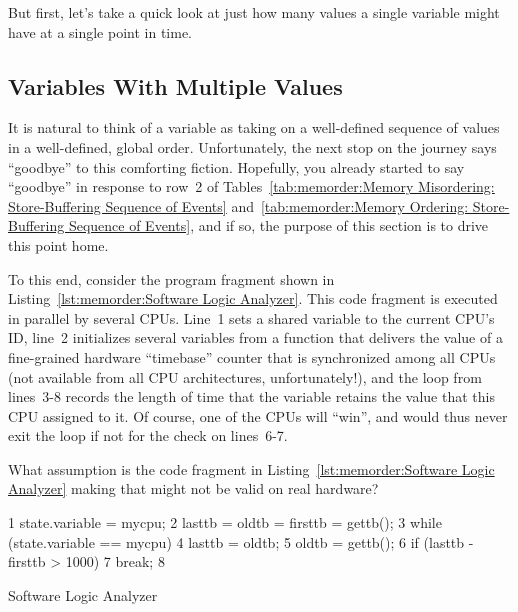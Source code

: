 But first, let's take a quick look at just how many values a single
variable might have at a single point in time.

\subsection{Variables With Multiple Values}
\label{sec:memorder:Variables With Multiple Values}

It is natural to think of a variable as taking on a well-defined
sequence of values in a well-defined, global order.
Unfortunately, the next stop on the journey says ``goodbye'' to this comforting fiction.
Hopefully, you already started to say ``goodbye'' in response to row~2 of
Tables~\ref{tab:memorder:Memory Misordering: Store-Buffering Sequence of Events}
and~\ref{tab:memorder:Memory Ordering: Store-Buffering Sequence of Events},
and if so, the purpose of this section is to drive this point home.

To this end, consider the program fragment shown in
Listing~\ref{lst:memorder:Software Logic Analyzer}.
This code fragment is executed in parallel by several CPUs.
Line~1 sets a shared variable to the current CPU's ID, line~2
initializes several variables from a  function that
delivers the value of a fine-grained hardware ``timebase'' counter that is
synchronized among all CPUs (not available from all CPU architectures,
unfortunately!), and the loop from lines~3-8 records the length of
time that the variable retains the value that this CPU assigned to it.
Of course, one of the CPUs will ``win'', and would thus never exit
the loop if not for the check on lines~6-7.

\QuickQuiz{}
	What assumption is the code fragment
	in Listing~\ref{lst:memorder:Software Logic Analyzer}
	making that might not be valid on real hardware?
 \QuickQuizEnd

\begin{listing}[tbp]
{ \scriptsize
\begin{verbbox}
  1 state.variable = mycpu;
  2 lasttb = oldtb = firsttb = gettb();
  3 while (state.variable == mycpu) {
  4   lasttb = oldtb;
  5   oldtb = gettb();
  6   if (lasttb - firsttb > 1000)
  7     break;
  8 }
\end{verbbox}
}
\centering
\theverbbox
\caption{Software Logic Analyzer}
\label{lst:memorder:Software Logic Analyzer}
\end{listing}

